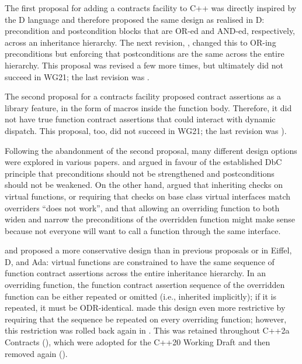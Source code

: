 The first proposal for adding a contracts facility to C++ \cite{N1613} was directly inspired by the D language and therefore proposed the same design as realised in D: precondition and postcondition blocks that are OR-ed and AND-ed, respectively, across an inheritance hierarchy. The next revision, \cite{N1669}, changed this to OR-ing preconditions but enforcing that postconditions are the same across the entire hierarchy.
This proposal was revised a few more times, but ultimately did not succeed in WG21; the last revision was \cite{N1962}.

The second proposal for a contracts facility \cite{N3604} proposed contract assertions as a library feature, in the form of macros inside the function body. Therefore, it did not have true function contract assertions that could interact with dynamic dispatch. This proposal, too, did not succeed in WG21; the last revision was \cite{N4378}).

Following the abandonment of the second proposal, many different design options were explored in various papers. \cite{N4110} and \cite{P0147R0} argued in favour of the established DbC principle that preconditions should not be strengthened and postconditions should not be weakened. On the other hand, \cite{P0247R0} argued that inheriting checks on virtual functions, or requiring that checks on base class virtual interfaces match overriders ``does not work'', and that allowing an overriding function to both widen and narrow the preconditions of the overridden function might make sense because not everyone will want to call a function through the same interface.

\cite{N4415} and \cite{P0287R0} proposed a more conservative design than in previous proposals or in Eiffel, D, and Ada: virtual functions are constrained to have the same sequence of function contract assertions across the entire inheritance hierarchy. In an overriding function, the function contract assertion sequence of the overridden function can be either repeated or omitted (i.e., inherited implicitly); if it is repeated, it must be ODR-identical. \cite{P0380R0} made this design even more restrictive by requiring that the sequence be repeated on every overriding function; however, this restriction was rolled back again in \cite{P0380R1}. This was retained throughout C++2a Contracts (\cite{P0542R5}), which were adopted for the C++20 Working Draft and then removed again (\cite{P1823R0}).

